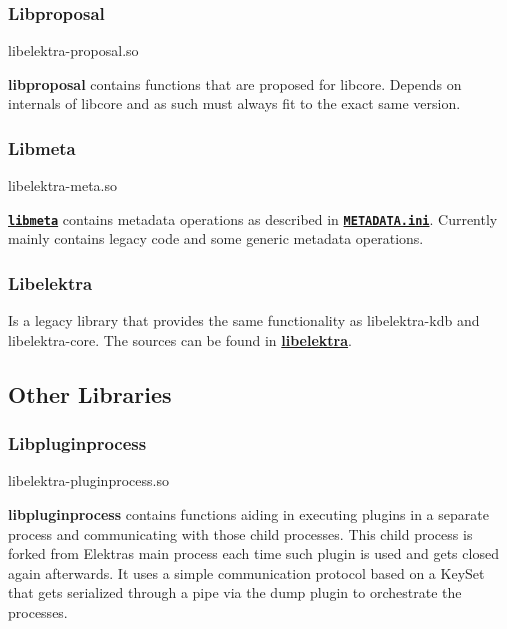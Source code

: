 \subsubsection*{Libproposal}


\begin{DoxyCode}
libelektra-proposal.so
\end{DoxyCode}


{\bfseries libproposal} contains functions that are proposed for libcore. Depends on internals of libcore and as such must always fit to the exact same version.

\subsubsection*{Libmeta}


\begin{DoxyCode}
libelektra-meta.so
\end{DoxyCode}


{\bfseries \href{/home/markus/Projekte/Elektra/current/src/libs/meta/meta.c}{\tt libmeta}} contains metadata operations as described in {\bfseries \href{/home/markus/Projekte/Elektra/current/doc/METADATA.ini}{\tt M\+E\+T\+A\+D\+A\+T\+A.\+ini}}. Currently mainly contains legacy code and some generic metadata operations.

\subsubsection*{Libelektra}

Is a legacy library that provides the same functionality as {\ttfamily libelektra-\/kdb} and {\ttfamily libelektra-\/core}. The sources can be found in {\bfseries \hyperlink{md_src_libs_elektra_README_src_libs_elektra_README_md}{libelektra}}.

\subsection*{Other Libraries}

\subsubsection*{Libpluginprocess}


\begin{DoxyCode}
libelektra-pluginprocess.so
\end{DoxyCode}


{\bfseries libpluginprocess} contains functions aiding in executing plugins in a separate process and communicating with those child processes. This child process is forked from Elektra\textquotesingle{}s main process each time such plugin is used and gets closed again afterwards. It uses a simple communication protocol based on a Key\+Set that gets serialized through a pipe via the dump plugin to orchestrate the processes.

